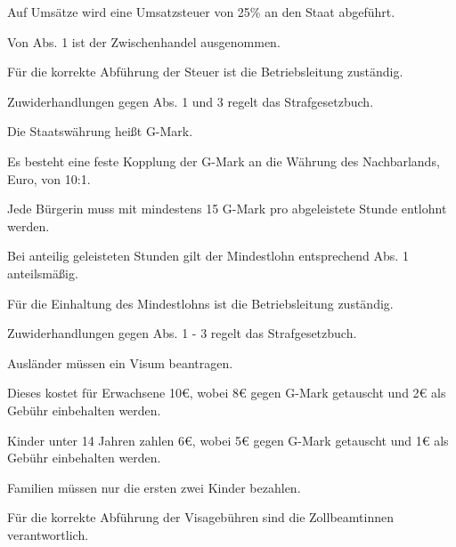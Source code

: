\documentclass{sasbase}
\begin{document}
\begin{lawparagraph}[Umsatzsteuer]
    \item Auf Umsätze wird eine Umsatzsteuer von 25\% an den Staat abgeführt.
    \item Von Abs. 1 ist der Zwischenhandel ausgenommen.
    \item Für die korrekte Abführung der Steuer ist die Betriebsleitung zuständig.
    \item Zuwiderhandlungen gegen Abs. 1 und 3 regelt das Strafgesetzbuch.
\end{lawparagraph}

\begin{lawparagraph}[Währung]
    \item Die Staatswährung heißt G-Mark.
    \item Es besteht eine feste Kopplung der G-Mark an die Währung des Nachbarlands, Euro, von 10:1.
\end{lawparagraph}

\begin{lawparagraph}[Mindestlohn]
    \item Jede Bürgerin muss mit mindestens 15 G-Mark pro abgeleistete Stunde entlohnt werden.
    \item Bei anteilig geleisteten Stunden gilt der Mindestlohn entsprechend Abs. 1 anteilsmäßig.
    \item Für die Einhaltung des Mindestlohns ist die Betriebsleitung zuständig.
    \item Zuwiderhandlungen gegen Abs. 1 - 3 regelt das Strafgesetzbuch.
\end{lawparagraph}

\begin{lawparagraph}
    \item Ausländer müssen ein Visum beantragen.
    \item Dieses kostet für Erwachsene 10€, wobei 8€ gegen G-Mark getauscht und 2€ als Gebühr
        einbehalten werden.
    \item Kinder unter 14 Jahren zahlen 6€, wobei 5€ gegen G-Mark getauscht und 1€ als Gebühr
        einbehalten werden.
    \item Familien müssen nur die ersten zwei Kinder bezahlen.
    \item Für die korrekte Abführung der Visagebühren sind die Zollbeamtinnen verantwortlich.
\end{lawparagraph}
\end{document}
